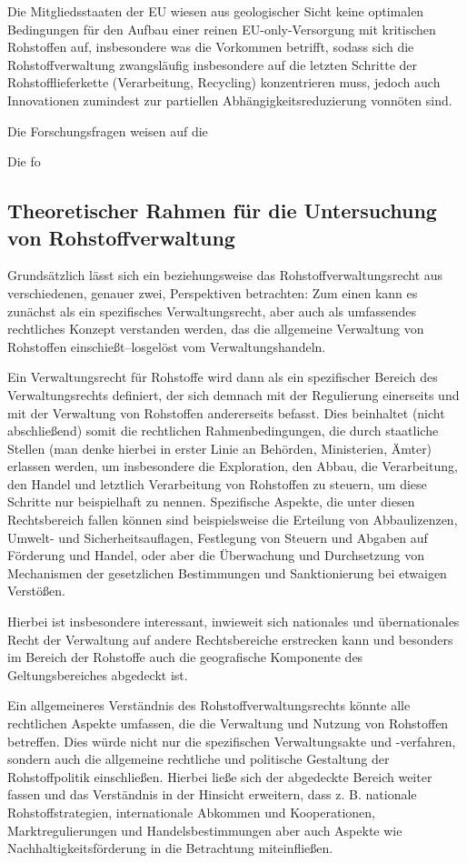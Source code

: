 \documentclass[12pt,a4paper,oneside]{book} %
\begin{document}
Die Mitgliedsstaaten der EU wiesen aus geologischer Sicht keine optimalen Bedingungen für den Aufbau einer reinen EU-only-Versorgung mit kritischen Rohstoffen auf, insbesondere was die Vorkommen betrifft, sodass sich die Rohstoffverwaltung zwangsläufig insbesondere auf die letzten Schritte der Rohstofflieferkette (Verarbeitung, Recycling) konzentrieren muss, jedoch auch Innovationen zumindest zur partiellen Abhängigkeitsreduzierung vonnöten sind.

Die Forschungsfragen weisen auf die 

Die fo
\subsection{Theoretischer Rahmen für die Untersuchung von Rohstoffverwaltung}
Grundsätzlich lässt sich ein beziehungsweise das Rohstoffverwaltungsrecht aus verschiedenen, genauer zwei, Perspektiven betrachten: Zum einen kann es zunächst als ein spezifisches Verwaltungsrecht, aber auch als umfassendes rechtliches Konzept verstanden werden, das die allgemeine Verwaltung von Rohstoffen einschießt--losgelöst vom Verwaltungshandeln.

Ein Verwaltungsrecht für Rohstoffe wird dann als ein spezifischer Bereich des Verwaltungsrechts definiert, der sich demnach mit der Regulierung einerseits und mit der Verwaltung von Rohstoffen andererseits befasst. Dies beinhaltet (nicht abschließend) somit die rechtlichen Rahmenbedingungen, die durch staatliche Stellen (man denke hierbei in erster Linie an Behörden, Ministerien, Ämter) erlassen werden, um insbesondere die Exploration, den Abbau, die Verarbeitung, den Handel und letztlich Verarbeitung von Rohstoffen zu steuern, um diese Schritte nur beispielhaft zu nennen. Spezifische Aspekte, die unter diesen Rechtsbereich fallen können sind beispielsweise die Erteilung von Abbaulizenzen, Umwelt- und Sicherheitsauflagen, Festlegung von Steuern und Abgaben auf Förderung und Handel, oder aber die Überwachung und Durchsetzung von Mechanismen der gesetzlichen Bestimmungen und Sanktionierung bei etwaigen Verstößen.

Hierbei ist insbesondere interessant, inwieweit sich nationales und übernationales Recht der Verwaltung auf andere Rechtsbereiche erstrecken kann und besonders im Bereich der Rohstoffe auch die geografische Komponente des Geltungsbereiches abgedeckt ist.

Ein allgemeineres Verständnis des Rohstoffverwaltungsrechts könnte alle rechtlichen Aspekte umfassen, die die Verwaltung und Nutzung von Rohstoffen betreffen. Dies würde nicht nur die spezifischen Verwaltungsakte und -verfahren, sondern auch die allgemeine rechtliche und politische Gestaltung der Rohstoffpolitik einschließen. Hierbei ließe sich der abgedeckte Bereich weiter fassen und das Verständnis in der Hinsicht erweitern, dass z. B. nationale Rohstoffstrategien, internationale Abkommen und Kooperationen, Marktregulierungen und Handelsbestimmungen aber auch Aspekte wie Nachhaltigkeitsförderung in die Betrachtung miteinfließen.
\end{document}
